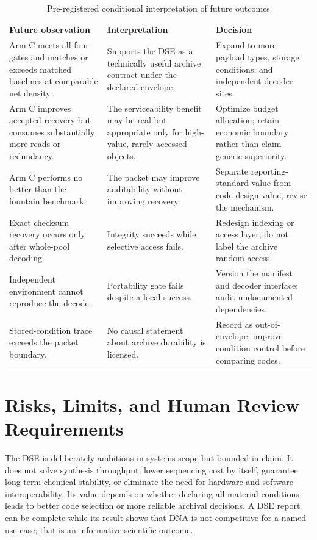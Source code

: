 \documentclass[conference]{IEEEtran}
\begin{document}
\begin{table}[t]
\caption{Pre-registered conditional interpretation of future outcomes}
\label{tab:decision}
\centering
\footnotesize
\begin{tabular}{p{}p{}p{}}
\toprule
\textbf{Future observation} & \textbf{Interpretation} & \textbf{Decision}\\
\midrule
Arm C meets all four gates and matches or exceeds matched baselines at comparable net density. & Supports the DSE as a technically useful archive contract under the declared envelope. & Expand to more payload types, storage conditions, and independent decoder sites.\\
Arm C improves accepted recovery but consumes substantially more reads or redundancy. & The serviceability benefit may be real but appropriate only for high-value, rarely accessed objects. & Optimize budget allocation; retain economic boundary rather than claim generic superiority.\\
Arm C performs no better than the fountain benchmark. & The packet may improve auditability without improving recovery. & Separate reporting-standard value from code-design value; revise the mechanism.\\
Exact checksum recovery occurs only after whole-pool decoding. & Integrity succeeds while selective access fails. & Redesign indexing or access layer; do not label the archive random access.\\
Independent environment cannot reproduce the decode. & Portability gate fails despite a local success. & Version the manifest and decoder interface; audit undocumented dependencies.\\
Stored-condition trace exceeds the packet boundary. & No causal statement about archive durability is licensed. & Record as out-of-envelope; improve condition control before comparing codes.\\
\bottomrule
\end{tabular}
\end{table}

\section{Risks, Limits, and Human Review Requirements}

The DSE is deliberately ambitious in systems scope but bounded in claim. It does not solve synthesis throughput, lower sequencing cost by itself, guarantee long-term chemical stability, or eliminate the need for hardware and software interoperability. Its value depends on whether declaring all material conditions leads to better code selection or more reliable archival decisions. A DSE report can be complete while its result shows that DNA is not competitive for a named use case; that is an informative scientific outcome.
\end{document}
